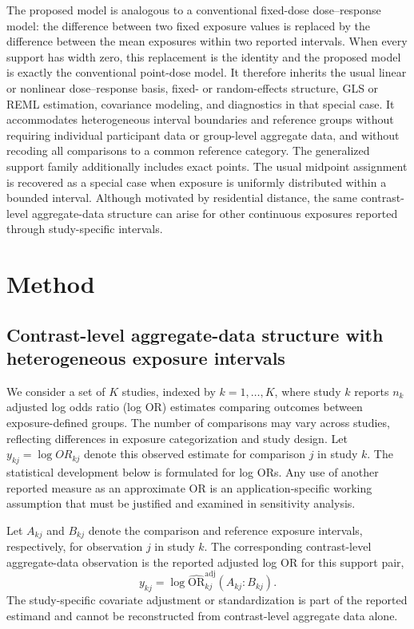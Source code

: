 \documentclass[journal=rsm]{CUP-JNL-DTM}%
\theoremstyle{definition}
\numberwithin{equation}{section}
\begin{document}
The proposed model is analogous to a conventional fixed-dose
dose--response model: the difference between two fixed exposure values is
replaced by the difference between the mean exposures within two reported
intervals. When every support
has width zero, this replacement is the identity and the proposed model is
exactly the conventional point-dose model. It therefore inherits the usual
linear or nonlinear dose--response basis, fixed- or random-effects structure,
GLS or REML estimation, covariance modeling, and diagnostics in that special
case. It accommodates heterogeneous interval boundaries and reference groups
without requiring individual participant data or group-level aggregate data, and without recoding all comparisons to a common reference category. The generalized support family additionally includes exact points. The usual midpoint assignment is recovered as a special case when exposure is uniformly distributed within a bounded interval. Although motivated by residential distance, the same contrast-level
aggregate-data structure can arise for other continuous exposures reported
through study-specific intervals.


\section{Method} \label{sec2}

\subsection{Contrast-level aggregate-data structure with heterogeneous exposure intervals}
\label{sec:data_structure}

We consider a set of $K$ studies, indexed by $k=1,\dots,K$, where
study $k$ reports $n_k$ adjusted log odds ratio (log OR) estimates comparing
outcomes between exposure-defined groups. The number of comparisons may vary
across studies, reflecting differences in exposure categorization and study
design. Let $y_{kj}=\log OR_{kj}$ denote this observed estimate for comparison
$j$ in study $k$. The statistical development below is formulated for log
ORs. Any use of another reported measure as an approximate OR is an
application-specific working assumption that must be justified and examined
in sensitivity analysis.

Let $A_{kj}$ and $B_{kj}$ denote the comparison and reference exposure
intervals, respectively, for observation $j$ in study $k$. The corresponding
contrast-level aggregate-data observation is the reported adjusted log OR for
this support pair,
\[
  y_{kj}=\log\widehat{\mathrm{OR}}^{\mathrm{adj}}_{kj}(A_{kj}:B_{kj}).
\]
The study-specific covariate adjustment or standardization is part of the
reported estimand and cannot be reconstructed from contrast-level aggregate
data alone.
\end{document}
